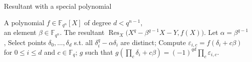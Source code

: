\documentclass{sig-alternate}
\newcommand{\ff}[1]{\mathbb{F}_{#1}}
\newcommand{\dd}{d}
\newcommand{\qq}{q}
\newcommand{\nn}{n}
\newcommand{\qn}{{\qq^\nn}}
\newcommand{\basef}{\ff{\qq}}
\newcommand{\extf}{\ff{\qn}}
\DeclareMathOperator{\Res}{Res}
\newcounter{algo}
\begin{document}
\begin{algorithm}
  \caption{Resultant with a special polynomial}
  \label{alg:resultant}
  \begin{algorithmic}[1]
    \REQUIRE A polynomial $f\in\extf[X]$ of degree $\dd<\qq^{n-1}$,\\
    an element $\beta\in\extf$.
    \ENSURE The resultant $\Res_X\bigl(X^\qq-\beta^{\qq-1}X-Y,f(X)).$
    \STATE Let $\alpha=\beta^{\qq-1}$,
    \STATE\label{alg:resultant:select} Select points $\delta_0,\dots,\delta_d$ s.t. all $\delta_i^\qq-\alpha\delta_i$ are distinct;
    \STATE\label{alg:resultant:multi-ev} Compute $\varepsilon_{i,c}=f(\delta_i+c\beta)$ for $0\le i\le\dd$ and $c\in\basef$;
    \RETURN\label{alg:resultant:interp} $g$ such that $g\left(\prod_c\delta_i+c\beta\right) = (-1)^{\qq\dd}  \prod_c\varepsilon_{i,c}$.
  \end{algorithmic}
\end{algorithm}
\end{document}
